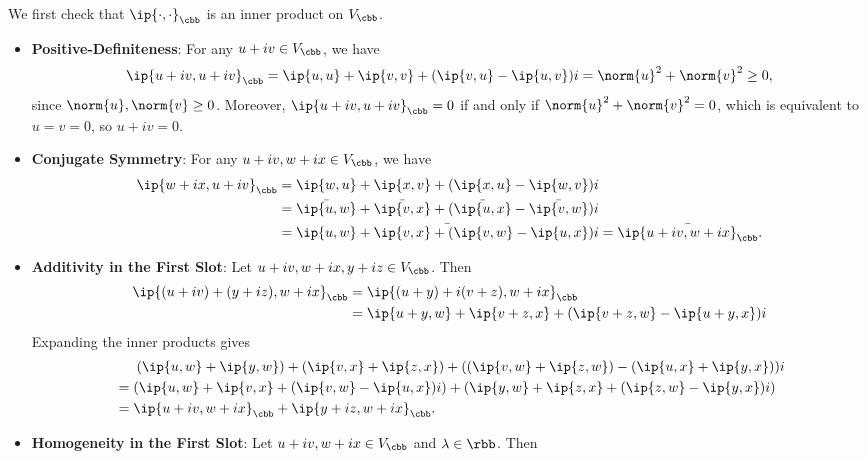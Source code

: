 \begin{solenum}
    \item We first check that $\ip{\cdot, \cdot}_{\cbb}$ is an inner product on $V_{\cbb}$.
    \begin{itemize}
        \item \textbf{Positive-Definiteness}: For any $u + iv \in V_{\cbb}$, we have
        \[
            \ip{u + iv, u + iv}_{\cbb} = \ip{u, u} + \ip{v, v} + (\ip{v, u} - \ip{u, v})i = \norm{u}^2 + \norm{v}^2 \geq 0,
        \]
        since $\norm{u}, \norm{v} \geq 0$.
        Moreover, $\ip{u + iv, u + iv}_{\cbb} = 0$ if and only if $\norm{u}^2 + \norm{v}^2 = 0$, which is equivalent to $u = v = 0$, so $u + iv = 0$.
        \item \textbf{Conjugate Symmetry}: For any $u + iv, w + ix \in V_{\cbb}$, we have
        \begin{align*}
            \ip{w + ix, u + iv}_{\cbb} &= \ip{w, u} + \ip{x, v} + (\ip{x, u} - \ip{w, v})i \\
            &= \bar{\ip{u, w}} + \bar{\ip{v, x}} + (\bar{\ip{u, x}} - \bar{\ip{v, w}})i \\
            &= \bar{\ip{u, w} + \ip{v, x} + (\ip{v, w} - \ip{u, x})i} = \bar{\ip{u + iv, w + ix}_{\cbb}}.
        \end{align*}
        \item \textbf{Additivity in the First Slot}: Let $u + iv, w + ix, y + iz \in V_{\cbb}$.
        Then
        \begin{align*}
            \ip{(u + iv) + (y + iz), w + ix}_{\cbb} &= \ip{(u + y) + i(v + z), w + ix}_{\cbb} \\
            &= \ip{u + y, w} + \ip{v + z, x} + (\ip{v + z, w} - \ip{u + y, x})i
        \end{align*}
        Expanding the inner products gives
        \begin{align*}
            &\phantom{==} (\ip{u, w} + \ip{y, w}) + (\ip{v, x} + \ip{z, x}) + ((\ip{v, w} + \ip{z, w}) - (\ip{u, x} + \ip{y, x}))i \\
            &= (\ip{u, w} + \ip{v, x} + (\ip{v, w} - \ip{u, x})i) + (\ip{y, w} + \ip{z, x} + (\ip{z, w} - \ip{y, x})i) \\
            &= \ip{u + iv, w + ix}_{\cbb} + \ip{y + iz, w + ix}_{\cbb}.
        \end{align*}
        \item \textbf{Homogeneity in the First Slot}: Let $u + iv, w + ix \in V_{\cbb}$ and $\lambda \in \rbb$.
        Then
        \begin{align*}

\end{align*}
\end{itemize}
\end{solenum}
